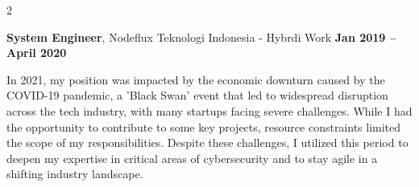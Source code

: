 \documentclass[10pt, letterpaper]{article}
\newenvironment{twocolentry}[2][]{
    \onecolentry
    \def\secondColumn{#2}
    \setcolumnwidth{\fill, 4.5 cm}
    \begin{paracol}{2}
}{
    \switchcolumn \raggedleft \secondColumn
    \end{paracol}
    \endonecolentry
} %
\begin{document}
        \begin{twocolentry}{
           \textbf{ Jan 2019 – April 2020}
        }
            \textbf{System Engineer}, Nodeflux Teknologi Indonesia - Hybrdi Work\end{twocolentry}
            \begin{justify}
			In 2021, my position was impacted by the economic downturn caused by the COVID-19 pandemic, a 'Black Swan' event that led to widespread disruption across the tech industry, with many startups facing severe challenges. While I had the opportunity to contribute to some key projects, resource constraints limited the scope of my responsibilities. Despite these challenges, I utilized this period to deepen my expertise in critical areas of cybersecurity and to stay agile in a shifting industry landscape.
		\end{justify}
        \vspace{0.10 cm}
\end{document}
